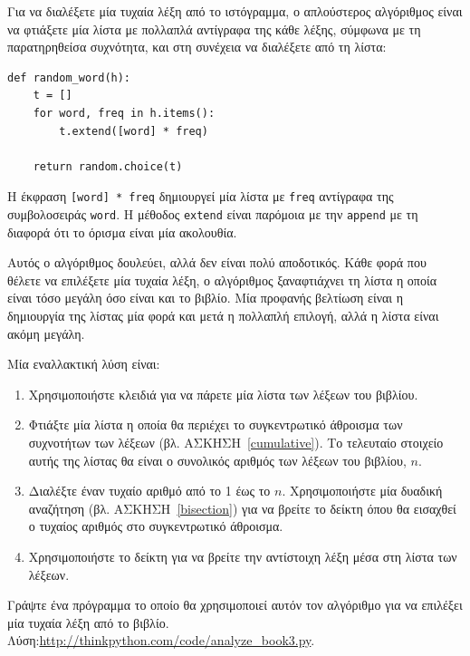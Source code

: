 \documentclass[10pt]{book}
\begin{document}
Για να διαλέξετε μία τυχαία λέξη από το ιστόγραμμα, ο απλούστερος αλγόριθμος είναι να φτιάξετε μία λίστα με πολλαπλά αντίγραφα της κάθε λέξης, σύμφωνα με τη παρατηρηθείσα συχνότητα, και στη συνέχεια να διαλέξετε από τη λίστα:

\begin{verbatim}
def random_word(h):
    t = []
    for word, freq in h.items():
        t.extend([word] * freq)

    return random.choice(t)
\end{verbatim}
%
Η έκφραση {\tt [word] * freq} δημιουργεί μία λίστα με {\tt freq} αντίγραφα της συμβολοσειράς {\tt word}. Η μέθοδος {\tt extend} είναι παρόμοια με την {\tt append} με τη διαφορά ότι το όρισμα είναι μία ακολουθία.
\\
\begin{exercise}
\label{randhist}

Αυτός ο αλγόριθμος δουλεύει, αλλά δεν είναι πολύ αποδοτικός. Κάθε φορά που θέλετε να επιλέξετε μία 
τυχαία λέξη, ο αλγόριθμος ξαναφτιάχνει τη λίστα η οποία είναι τόσο μεγάλη όσο είναι και το βιβλίο. Μία προφανής βελτίωση είναι η δημιουργία της λίστας μία φορά και μετά η πολλαπλή επιλογή, αλλά η λίστα είναι ακόμη μεγάλη.

Μία εναλλακτική λύση είναι:

\begin{enumerate}

\item  Χρησιμοποιήστε κλειδιά για να πάρετε μία λίστα των λέξεων του βιβλίου. 

\item  Φτιάξτε μία λίστα η οποία θα περιέχει το συγκεντρωτικό άθροισμα των συχνοτήτων των λέξεων (βλ. ΑΣΚΗΣΗ~\ref{cumulative}). Το τελευταίο στοιχείο αυτής της λίστας θα είναι ο συνολικός αριθμός των λέξεων του βιβλίου,   $n$.

\item  Διαλέξτε έναν τυχαίο αριθμό από το 1 έως το $n$. Χρησιμοποιήστε μία δυαδική αναζήτηση (βλ. ΑΣΚΗΣΗ~\ref{bisection}) για να βρείτε το δείκτη όπου θα εισαχθεί ο τυχαίος αριθμός στο συγκεντρωτικό άθροισμα. 

\item  Χρησιμοποιήστε το δείκτη για να βρείτε την αντίστοιχη λέξη μέσα στη λίστα των λέξεων. 

\end{enumerate}

Γράψτε ένα πρόγραμμα το οποίο θα χρησιμοποιεί αυτόν τον αλγόριθμο για να επιλέξει μία τυχαία λέξη από το βιβλίο. Λύση:\url{http://thinkpython.com/code/analyze_book3.py}.
\end{exercise}
\end{document}
